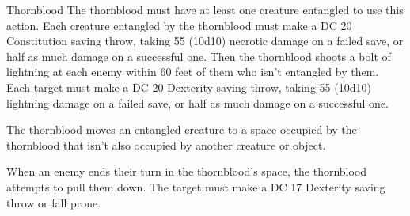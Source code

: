 \documentclass[10pt,a4paper,twoside,bg=print,twocolumn,openany,nodeprecatedcode]{dndbook}
\begin{document}
\begin{DndMonster}[float=t]{Thornblood}
The thornblood must have at least one creature entangled to use this action. Each creature entangled by the thornblood must make a DC 20 Constitution saving throw, taking 55 (10d10) necrotic damage on a failed save, or half as much damage on a successful one. Then the thornblood shoots a bolt of lightning at each enemy within 60 feet of them who isn't entangled by them. Each target must make a DC 20 Dexterity saving throw, taking 55 (10d10) lightning damage on a failed save, or half as much damage on a successful one.

The thornblood moves an entangled creature to a space occupied by the thornblood that isn't also occupied by another creature or object.

When an enemy ends their turn in the thornblood's space, the thornblood attempts to pull them down. The target must make a DC 17 Dexterity saving throw or fall prone.

\end{DndMonster}
\end{document}
